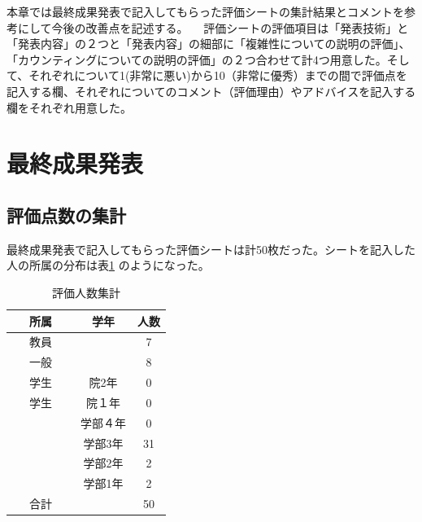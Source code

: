  本章では最終成果発表で記入してもらった評価シートの集計結果とコメントを参考にして今後の改善点を記述する。
　評価シートの評価項目は「発表技術」と「発表内容」の２つと「発表内容」の細部に「複雑性についての説明の評価」、「カウンティングについての説明の評価」の２つ合わせて計4つ用意した。そして、それぞれについて1(非常に悪い)から10（非常に優秀）までの間で評価点を記入する欄、それぞれについてのコメント（評価理由）やアドバイスを記入する欄をそれぞれ用意した。
\section{最終成果発表}
\subsection{評価点数の集計}
最終成果発表で記入してもらった評価シートは計50枚だった。シートを記入した人の所属の分布は表\ref{tab:dist2} のようになった。

\begin{table}[htb]
  \begin{center}
    \caption{評価人数集計}
    \begin{tabular}{|c|c|c|} \hline 
      所属 & 学年 & 人数  \\ \hline \hline
      教員 &  & 7  \\
      一般 &  & 8 \\
      学生 & 院2年 & 0 \\
     学生 & 院１年 & 0 \\
             & 学部４年 & 0 \\
 　　　　　 & 学部3年 & 31 \\
             & 学部2年 & 2 \\
             & 学部1年 & 2 \\ \hline \hline
      合計 &  & 50 \\ \hline
    \end{tabular}
    \label{tab:dist2}
  \end{center}
\end{table}

